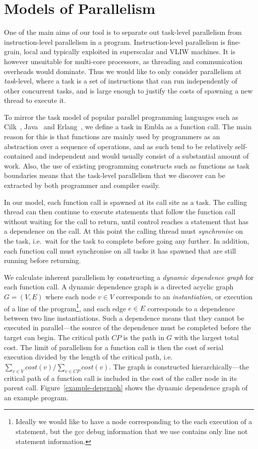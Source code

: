 \section{Models of Parallelism} \label{smethod}

One of the main aims of our tool is to separate out task-level parallelism from instruction-level parallelism in a program.
Instruction-level parallelism is fine-grain, local and typically exploited in superscalar and VLIW machines.
It is however unsuitable for multi-core processors, as threading and communication overheads would dominate.
Thus we would like to only consider parallelism at \emph{task}-level, where a task is a set of instructions that can run independently of other concurrent tasks, and is large enough to justify the costs of spawning a new thread to execute it.

To mirror the task model of popular parallel programming languages such as Cilk~\cite{blumofe96cilk}, Java~\cite{lea00java} and Erlang~\cite{armstrong07programming}, we define a task in Embla as a function call.
The main reason for this is that functions are mainly used by programmers as an abstraction over a sequence of operations, and as such tend to be relatively self-contained and independent and would usually consist of a substantial amount of work.
Also, the use of existing programming constructs such as functions as task boundaries means that the task-level parallelism that we discover can be extracted by both programmer and compiler easily.

In our model, each function call is spawned at its call site as a task.
The calling thread can then continue to execute statements that follow the function call without waiting for the call to return, until control reaches a statement that has a dependence on the call.
At this point the calling thread must \emph{synchronise} on the task, i.e.\ wait for the task to complete before going any further.
In addition, each function call must synchronise on all tasks it has spawned that are still running before returning.

We calculate inherent parallelism by constructing a \emph{dynamic dependence graph} for each function call.
A dynamic dependence graph is a directed acyclic graph $G=(V,E)$ where each node $v\in V$ corresponds to an \emph{instantiation}, or execution of a line of the program\footnote{Ideally we would like to have a node corresponding to the each execution of a statement, but the gcc debug information that we use contains only line not statement information.}, and each edge $e\in E$ corresponds to a dependence between two line instantiations.
Such a dependence means that they cannot be executed in parallel---the source of the dependence must be completed before the target can begin.
The critical path $\mathit{CP}$ is the path in $G$ with the largest total cost.
The limit of parallelism for a function call is then the cost of serial execution divided by the length of the critical path, i.e. $\sum_{v\in V} cost(v)/\sum_{v\in \mathit{CP}} cost(v)$.
The graph is constructed hierarchically---the critical path of a function call is included in the cost of the caller node in its parent call.
Figure~\ref{example-depgraph} shows the dynamic dependence graph of an example program.

